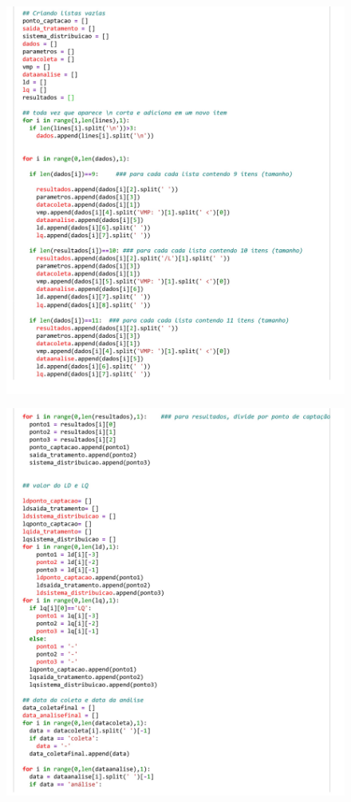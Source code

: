 \begin{apendicesenv}
\begin{figure}[!htb]
\centering
\includegraphics[scale=0.4]{colab/laudos 2.png}
\label{fig04}
\end{figure}

\begin{figure}[!htb]
\centering
\includegraphics[scale=0.4]{colab/laudos 3.png}
\label{fig04}
\end{figure}


\end{apendicesenv}
